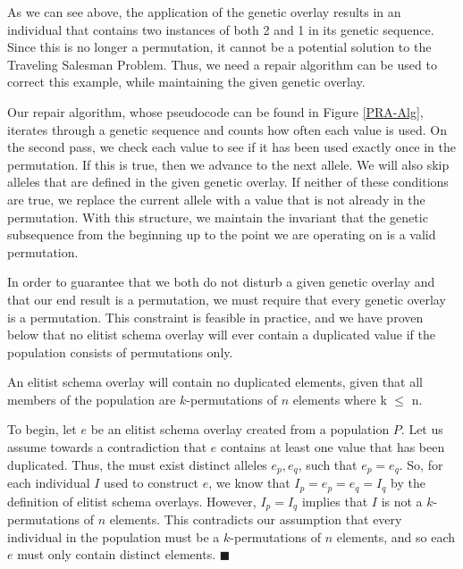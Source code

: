 As we can see above, the application of the genetic overlay results in an individual that contains two instances of both 2 and 1 in its genetic sequence. Since this is no longer a permutation, it cannot be a potential solution to the Traveling Salesman Problem. Thus, we need a repair algorithm can be used to correct this example, while maintaining the given genetic overlay. 

Our repair algorithm, whose pseudocode can be found in Figure \ref{PRA-Alg}, iterates through a genetic sequence and counts how often each value is used. On the second pass, we check each value to see if it has been used exactly once in the permutation. If this is true, then we advance to the next allele. We will also skip alleles that are defined in the given genetic overlay. If neither of these conditions are true, we replace the current allele with a value that is not already in the permutation. With this structure, we maintain the invariant that the genetic subsequence from the beginning up to the point we are operating on is a valid permutation.

In order to guarantee that we both do not disturb a given genetic overlay and that our end result is a permutation, we must require that every genetic overlay is a permutation. This constraint is feasible in practice, and we have proven below that no elitist schema overlay will ever contain a duplicated value if the population consists of permutations only.

\begin{thm}
An elitist schema overlay will contain no duplicated elements, given that all members of the population are $k$-permutations of $n$ elements where k $\leq$ n.
\end{thm}

To begin, let $e$ be an elitist schema overlay created from a population $P$. Let us assume towards a contradiction that $e$ contains at least one value that has been duplicated. Thus, the must exist distinct alleles $e_p, e_q$, such that $e_p = e_q$. So, for each individual $I$ used to construct $e$, we know that $I_p = e_p = e_q = I_q$ by the definition of elitist schema overlays. However, $I_p = I_q$ implies that $I$ is not a $k$-permutations of $n$ elements. This contradicts our assumption that every individual in the population must be a $k$-permutations of $n$ elements, and so each $e$ must only contain distinct elements. $\blacksquare$

